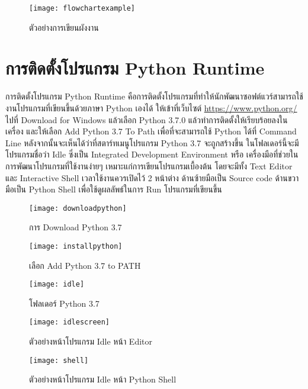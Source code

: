 \begin{figure}[h]
\caption{ตัวอย่างการเขียนผังงาน}
\texttt{[image: flowchartexample]}
\centering
\end{figure}

\section{การติดตั้งโปรแกรม Python Runtime}

การติดตั้งโปรแกรม Python Runtime คือการติดตั้งโปรแกรมที่ทำให้นักพัฒนาซอฟต์แวร์สามารถใช้งานโปรแกรมที่เขียนขึ้นด้วยภาษา Python เองได้ ให้เข้าที่เว็บไซต์ \url{https://www.python.org/} \cite{Pyt19} ไปที่ Download for Windows แล้วเลือก Python 3.7.0 แล้วทำการติดตั้งให้เรียบร้อยลงในเครื่อง และให้เลือก Add Python 3.7 To Path เพื่อที่จะสามารถใช้ Python ได้ที่ Command Line หลังจากนั้นจะเห็นได้ว่าที่สตาร์ทเมนูโปรแกรม Python 3.7 จะถูกสร้างขึ้น ในโฟลเดอร์นี้จะมีโปรแกรมชื่อว่า Idle ซึ่งเป็น Integrated Development Environment หรือ เครื่องมือที่ช่วยในการพัฒนาโปรแกรมที่ใช้งานง่ายๆ เหมาะแก่การเขียนโปรแกรมเบื้องต้น โดยจะมีทั้ง Text Editor และ Interactive Shell เวลาใช้งานควรเปิดไว้ 2 หน้าต่าง ด้านซ้ายมือเป็น Source code ด้านขวามือเป็น Python Shell เพื่อใช้ดูผลลัพธ์ในการ Run โปรแกรมที่เขียนขึ้น

\begin{figure}[h]
\caption{การ Download Python 3.7}
\texttt{[image: downloadpython]}
\centering

\end{figure}

\begin{figure}[h]
\caption{เลือก Add Python 3.7 to PATH}
\texttt{[image: installpython]}
\centering

\end{figure}


\begin{figure}[h]
\caption{โฟลเดอร์ Python 3.7 }
\texttt{[image: idle]}
\centering

\end{figure}


\begin{figure}[h]
\caption{ตัวอย่างหน้าโปรแกรม Idle หน้า Editor}
\texttt{[image: idlescreen]}
\centering

\end{figure}

\begin{figure}[h]
\caption{ตัวอย่างหน้าโปรแกรม Idle หน้า Python Shell}
\texttt{[image: shell]}
\centering

\end{figure}






